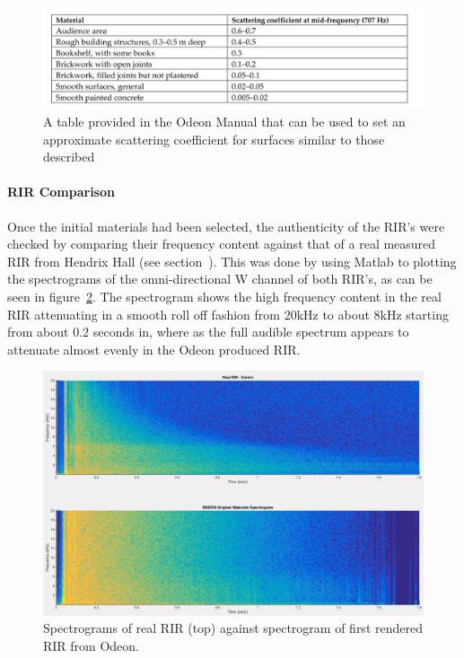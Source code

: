 \documentclass[../../main.tex]{subfiles}
\begin{document}
			\begin{figure}[H]
				\centerline{\includegraphics[scale = 0.3]{Sections/Implementation/Odeon/images/scatteringCoefficients.png}}
				\caption{A table provided in the Odeon Manual \cite{odeonManual} that can be used to set an approximate scattering coefficient for surfaces similar to those described}
				\label{odeonTable}
			\end{figure}
		
		\paragraph{RIR Comparison}

			Once the initial materials had been selected, the authenticity of the \ac{RIR}'s were checked by comparing their frequency content against that of a real measured \ac{RIR} from Hendrix Hall (see section~). This was done by using Matlab to plotting the spectrograms of the omni-directional W channel of both \ac{RIR}'s, as can be seen in figure~\ref{compareOriginal}. The spectrogram shows the high frequency content in the real \ac{RIR} attenuating in a smooth roll off fashion from 20kHz to about 8kHz starting from about 0.2 seconds in, where as the full audible spectrum appears to attenuate almost evenly in the Odeon produced \ac{RIR}.

			\begin{figure}[H]
				\centerline{\includegraphics[scale = 0.3]{Sections/Implementation/Odeon/images/MaterialCompare/OriginalMaterials/original.png}}
				\caption{Spectrograms of real \ac{RIR} (top) against spectrogram of first rendered \ac{RIR} from Odeon.}
				\label{compareOriginal}
			\end{figure}
\end{document}
